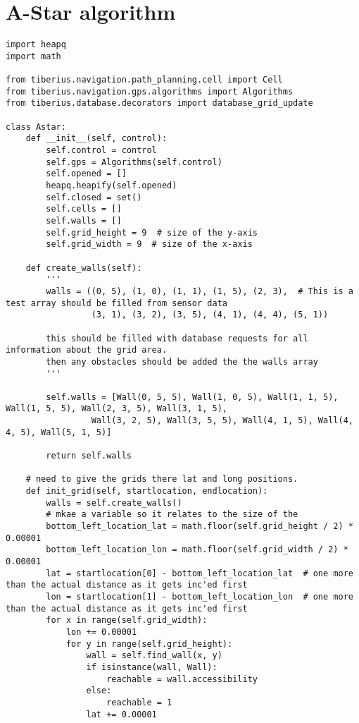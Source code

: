 \chapter{A-Star algorithm}
\label{app:Astar}
\pagestyle{stuart}

\begin{lstlisting}[style=custompython, label=astar-code, caption=A-Star algorithm class code]
import heapq
import math

from tiberius.navigation.path_planning.cell import Cell
from tiberius.navigation.gps.algorithms import Algorithms
from tiberius.database.decorators import database_grid_update

class Astar:
    def __init__(self, control):
        self.control = control
        self.gps = Algorithms(self.control)
        self.opened = []
        heapq.heapify(self.opened)
        self.closed = set()
        self.cells = []
        self.walls = []
        self.grid_height = 9  # size of the y-axis
        self.grid_width = 9  # size of the x-axis

    def create_walls(self):
        '''
        walls = ((0, 5), (1, 0), (1, 1), (1, 5), (2, 3),  # This is a test array should be filled from sensor data
                 (3, 1), (3, 2), (3, 5), (4, 1), (4, 4), (5, 1))

        this should be filled with database requests for all information about the grid area.
        then any obstacles should be added the the walls array
        '''

        self.walls = [Wall(0, 5, 5), Wall(1, 0, 5), Wall(1, 1, 5), Wall(1, 5, 5), Wall(2, 3, 5), Wall(3, 1, 5),
                 Wall(3, 2, 5), Wall(3, 5, 5), Wall(4, 1, 5), Wall(4, 4, 5), Wall(5, 1, 5)]

        return self.walls

    # need to give the grids there lat and long positions.
    def init_grid(self, startlocation, endlocation):
        walls = self.create_walls()
        # mkae a variable so it relates to the size of the
        bottom_left_location_lat = math.floor(self.grid_height / 2) * 0.00001
        bottom_left_location_lon = math.floor(self.grid_width / 2) * 0.00001
        lat = startlocation[0] - bottom_left_location_lat  # one more than the actual distance as it gets inc'ed first
        lon = startlocation[1] - bottom_left_location_lon  # one more than the actual distance as it gets inc'ed first
        for x in range(self.grid_width):
            lon += 0.00001
            for y in range(self.grid_height):
                wall = self.find_wall(x, y)
                if isinstance(wall, Wall):
                    reachable = wall.accessibility
                else:
                    reachable = 1
                lat += 0.00001


\end{lstlisting}
